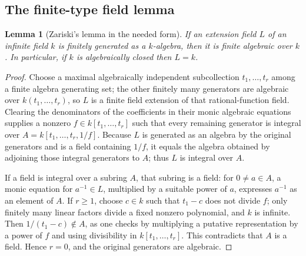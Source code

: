 \documentclass[11pt,letterpaper]{article}
\numberwithin{equation}{section}
\newtheorem{lemma}[theorem]{Lemma}
\theoremstyle{definition}
\theoremstyle{remark}\newtheorem{remark}[theorem]{Remark}
\begin{document}
\subsection{The finite-type field lemma}
\begin{lemma}[Zariski's lemma in the needed form]\label{polynomial:lem:zariski}
If an extension field $L$ of an infinite field $k$ is finitely generated as a
$k$-algebra, then it is finite algebraic over $k$. In particular, if $k$ is
algebraically closed then $L=k$.
\end{lemma}
\begin{proof}
Choose a maximal algebraically independent subcollection $t_1,\ldots,t_r$
among a finite algebra generating set; the other finitely many generators are
algebraic over $k(t_1,\ldots,t_r)$, so $L$ is a finite field extension of that
rational-function field. Clearing the denominators of the coefficients in
their monic algebraic equations supplies a nonzero
$f\in k[t_1,\ldots,t_r]$ such that every remaining generator is integral over
$A=k[t_1,\ldots,t_r,1/f]$. Because $L$ is generated as an algebra by the
original generators and is a field containing $1/f$, it equals the algebra
obtained by adjoining those integral generators to $A$; thus $L$ is integral
over $A$.

If a field is integral over a subring $A$, that subring is a field: for
$0\ne a\in A$, a monic equation for $a^{-1}\in L$, multiplied by a suitable
power of $a$, expresses $a^{-1}$ as an element of $A$. If $r\ge1$, choose
$c\in k$ such that $t_1-c$ does not divide $f$; only finitely many linear
factors divide a fixed nonzero polynomial, and $k$ is infinite. Then
$1/(t_1-c)\notin A$, as one checks by multiplying a putative representation by
a power of $f$ and using divisibility in $k[t_1,\ldots,t_r]$. This contradicts
that $A$ is a field. Hence $r=0$, and the original generators are algebraic.
\end{proof}
\end{document}
